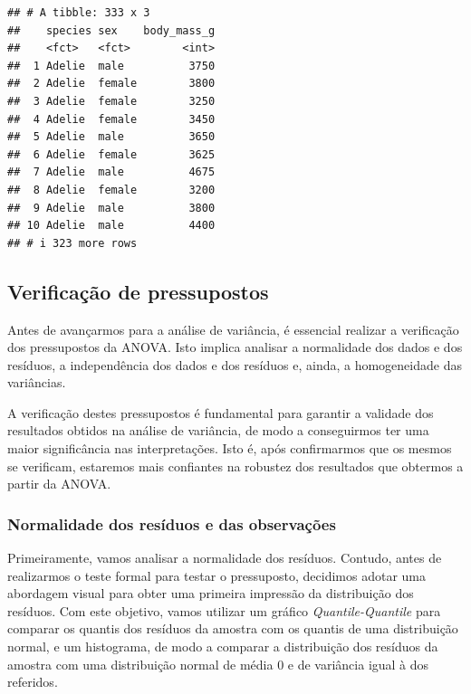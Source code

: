 \documentclass[]{article}
\begin{document}
\begin{verbatim}
## # A tibble: 333 x 3
##    species sex    body_mass_g
##    <fct>   <fct>        <int>
##  1 Adelie  male          3750
##  2 Adelie  female        3800
##  3 Adelie  female        3250
##  4 Adelie  female        3450
##  5 Adelie  male          3650
##  6 Adelie  female        3625
##  7 Adelie  male          4675
##  8 Adelie  female        3200
##  9 Adelie  male          3800
## 10 Adelie  male          4400
## # i 323 more rows
\end{verbatim}

\subsection{Verificação de pressupostos}

Antes de avançarmos para a análise de variância, é essencial realizar a
verificação dos pressupostos da ANOVA. Isto implica analisar a
normalidade dos dados e dos resíduos, a independência dos dados e dos
resíduos e, ainda, a homogeneidade das variâncias.

A verificação destes pressupostos é fundamental para garantir a validade
dos resultados obtidos na análise de variância, de modo a conseguirmos
ter uma maior significância nas interpretações. Isto é, após
confirmarmos que os mesmos se verificam, estaremos mais confiantes na
robustez dos resultados que obtermos a partir da ANOVA.

\begin{Shaded}
\begin{Highlighting}[]

\OtherTok{\textless{}{-}} \NormalTok{(}\SpecialCharTok{\textasciitilde{}}\SpecialCharTok{*}
\end{Highlighting}
\end{Shaded}

\subsubsection{Normalidade dos resíduos e das observações}

Primeiramente, vamos analisar a normalidade dos resíduos. Contudo, antes
de realizarmos o teste formal para testar o pressuposto, decidimos
adotar uma abordagem visual para obter uma primeira impressão da
distribuição dos resíduos. Com este objetivo, vamos utilizar um gráfico
\emph{Quantile-Quantile} para comparar os quantis dos resíduos da
amostra com os quantis de uma distribuição normal, e um histograma, de
modo a comparar a distribuição dos resíduos da amostra com uma
distribuição normal de média 0 e de variância igual à dos referidos.
\end{document}
